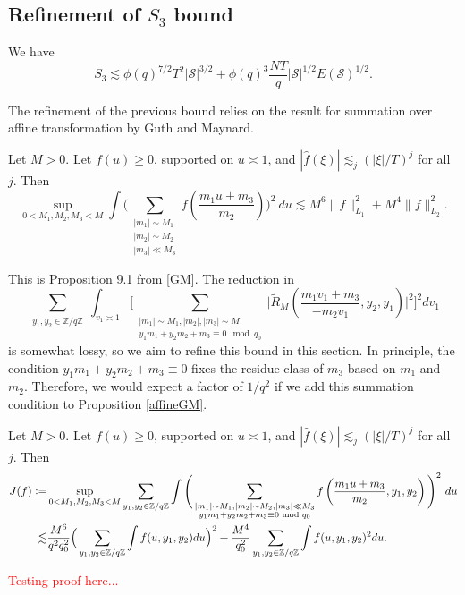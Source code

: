 \subsection{Refinement of $S_3$ bound}

\begin{proposition}[Refinement of $S_3$]
    \label{refinements_3}
    We have \[
    S_3\lesssim \phi(q)^{7/2}T^2|\mathcal{S}|^{3/2}+\phi(q)^{3}\frac{NT}{q}|\mathcal{S}|^{1/2}E(\mathcal{S})^{1/2}.
     \]
\end{proposition}
The refinement of the previous bound relies on the result for summation over affine transformation by Guth and Maynard.
\begin{lemma} \label{affineGM}
    Let $M>0$. Let $f(u)\geq 0$, supported on $u\asymp 1$, and $|\hat{f}(\xi)|\lesssim_j (|\xi|/T)^j$ for all $j$. Then \[
        \sup_{0<M_1,M_2,M_3<M} \int\Bigg( \sum_{\substack{|m_1|\sim M_1\\|m_2|\sim M_2 \\ |m_3|\ll M_3}} f\left(\frac{m_1 u+m_3}{m_2}\right)\Bigg)^2 \ du \lesssim M^6 \|f\|_{L_1}^2+M^4\|f\|_{L_2}^2.
    \] 
\end{lemma}
This is Proposition 9.1 from [GM]. The reduction in \[
\sum_{\substack{y_1,y_2 \in\mathbb{Z}/q\mathbb{Z} }}\int_{v_1\asymp 1}\Big[\sum_{\substack{|m_1|\sim M_1,|m_2|,|m_3|\sim M\\ y_1m_1+y_2m_2+m_3\equiv 0 \mod q_0}}\Big|\tilde{R}_M\left(\frac{m_1v_1+m_3}{-m_2v_1},y_2,y_1\right)\Big|^2\Big]^2dv_1\]
is somewhat lossy, so we aim to refine this bound in this section.
In principle, the condition $y_1m_1+y_2m_2+m_3\equiv 0$ fixes the residue class of $m_3$ based on $m_1$ and $m_2$. Therefore, we would expect a factor of $1/q^2$ if we add this summation condition to Proposition \ref{affineGM}. 
\begin{lemma}\label{affinetrans}
    Let $M>0$. Let $f(u)\geq 0$, supported on $u\asymp 1$, and $|\hat{f}(\xi)|\lesssim_j (|\xi|/T)^j$ for all $j$. Then \begin{align*}
        J(f)\mathrel{\mathop:}= &\sup_{0<M_1,M_2,M_3<M}\sum_{\substack{y_1,y_2 \in\mathbb{Z}/q\mathbb{Z} }} \int\Bigg( \sum_{\substack{|m_1|\sim M_1,|m_2|\sim M_2 , |m_3|\ll M_3\\ y_1m_1+y_2m_2+m_3\equiv 0 \textrm{ mod } q_0}} f\left(\frac{m_1 u+m_3}{m_2},y_1,y_2\right)\Bigg)^2 \ du\\
        \lesssim&\frac{M^6}{q^2q_0^2}\Big(\sum_{\substack{y_1,y_2 \in\mathbb{Z}/q\mathbb{Z} }} \int f(u,y_1,y_2) du\Big)^2+\frac{M^4}{q_0^2} \sum_{\substack{y_1,y_2 \in\mathbb{Z}/q\mathbb{Z} }} \int f(u,y_1,y_2)^2 du.
    \end{align*}
\end{lemma}
\textcolor{red}{Testing proof here...}

